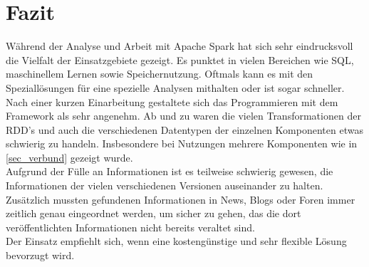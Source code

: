 \newpage
\chapter{Fazit} 

Während der Analyse und Arbeit mit Apache Spark hat sich sehr eindrucksvoll die Vielfalt der Einsatzgebiete gezeigt. Es punktet in vielen Bereichen wie SQL, maschinellem Lernen sowie Speichernutzung. Oftmals kann es mit den Speziallösungen für eine spezielle Analysen mithalten oder ist sogar schneller.\\

\noindent
Nach einer kurzen Einarbeitung gestaltete sich das Programmieren mit dem Framework als sehr angenehm. Ab und zu waren die vielen Transformationen der RDD's und auch die verschiedenen Datentypen der einzelnen Komponenten etwas schwierig zu handeln. Insbesondere bei Nutzungen mehrere Komponenten wie in \autoref{sec_verbund} gezeigt wurde.\\

\noindent
Aufgrund der Fülle an Informationen ist es teilweise schwierig gewesen, die Informationen der vielen verschiedenen Versionen auseinander zu halten. Zusätzlich mussten gefundenen Informationen in News, Blogs oder Foren immer zeitlich genau eingeordnet werden, um sicher zu gehen, das die dort veröffentlichten Informationen nicht bereits veraltet sind.\\

\noindent
Der Einsatz empfiehlt sich, wenn eine kostengünstige und sehr flexible Lösung bevorzugt wird.